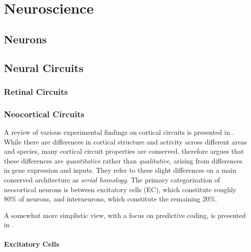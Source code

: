\chapter{Neuroscience}

\section{Neurons}

\section{Neural Circuits}

\subsection{Retinal Circuits}


\subsection{Neocortical Circuits}

A review of various experimental findings on cortical circuits is presented in \cite{harris2015neocortical}. While there are differences in cortical structure and activity across different areas and species, many cortical circuit properties are conserved. \cite{harris2015neocortical} therefore argues that these differences are \textit{quantitative} rather than \textit{qualitative}, arising from differences in gene expression and inputs. They refer to these slight differences on a main conserved architecture as \textit{serial homology}. The primary categorization of neocortical neurons is between excitatory cells (EC), which constitute roughly $80\%$ of neurons, and interneurons, which constitute the remaining $20\%$.  

A somewhat more simplistic view, with a focus on predictive coding, is presented in \cite{bastos2012canonical}.

\subsubsection{Excitatory Cells}

